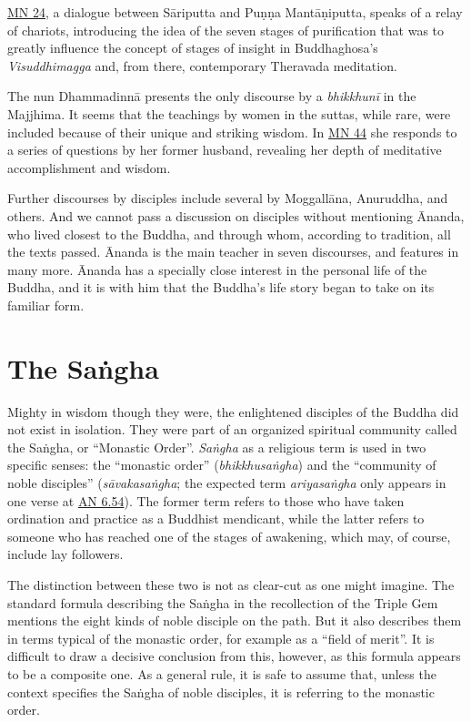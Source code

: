 \documentclass[12pt,openany]{book}%
\begin{document}
\href{https://suttacentral.net/mn24}{MN 24}, a dialogue between \textsanskrit{Sāriputta} and \textsanskrit{Puṇṇa} \textsanskrit{Mantāṇiputta}, speaks of a relay of chariots, introducing the idea of the seven stages of purification that was to greatly influence the concept of stages of insight in Buddhaghosa’s \textit{Visuddhimagga} and, from there, contemporary Theravada meditation.

The nun \textsanskrit{Dhammadinnā} presents the only discourse by a \textit{\textsanskrit{bhikkhunī}} in the Majjhima. It seems that the teachings by women in the suttas, while rare, were included because of their unique and striking wisdom. In \href{https://suttacentral.net/mn44}{MN 44} she responds to a series of questions by her former husband, revealing her depth of meditative accomplishment and wisdom.

Further discourses by disciples include several by \textsanskrit{Moggallāna}, Anuruddha, and others. And we cannot pass a discussion on disciples without mentioning Ānanda, who lived closest to the Buddha, and through whom, according to tradition, all the texts passed. Ānanda is the main teacher in seven discourses, and features in many more. Ānanda has a specially close interest in the personal life of the Buddha, and it is with him that the Buddha’s life story began to take on its familiar form.

\section*{The \textsanskrit{Saṅgha}}

Mighty in wisdom though they were, the enlightened disciples of the Buddha did not exist in isolation. They were part of an organized spiritual community called the \textsanskrit{Saṅgha}, or “Monastic Order”. \textit{\textsanskrit{Saṅgha}} as a religious term is used in two specific senses: the “monastic order” (\textit{\textsanskrit{bhikkhusaṅgha}}) and the “community of noble disciples” (\textit{\textsanskrit{sāvakasaṅgha}}; the expected term \textit{\textsanskrit{ariyasaṅgha}} only appears in one verse at \href{https://suttacentral.net/an6.54}{AN 6.54}). The former term refers to those who have taken ordination and practice as a Buddhist mendicant, while the latter refers to someone who has reached one of the stages of awakening, which may, of course, include lay followers.

The distinction between these two is not as clear-cut as one might imagine. The standard formula describing the \textsanskrit{Saṅgha} in the recollection of the Triple Gem mentions the eight kinds of noble disciple on the path. But it also describes them in terms typical of the monastic order, for example as a “field of merit”. It is difficult to draw a decisive conclusion from this, however, as this formula appears to be a composite one. As a general rule, it is safe to assume that, unless the context specifies the \textsanskrit{Saṅgha} of noble disciples, it is referring to the monastic order.
\end{document}
